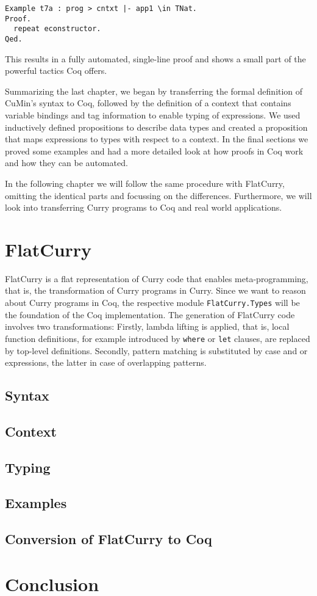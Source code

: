 \documentclass[fleqn]{scrreprt}
\newcommand{\todo}[1]{\marginpar{\textbf{TODO:} #1}}
\begin{document}
\begin{verbatim}
Example t7a : prog > cntxt |- app1 \in TNat.
Proof.
  repeat econstructor.
Qed.
\end{verbatim}
This results in a fully automated, single-line proof and shows a small part of the powerful tactics Coq offers.
\par
Summarizing the last chapter, we began by transferring the formal definition of CuMin's syntax to Coq, followed by the definition of a context that contains variable bindings and tag information to enable typing of expressions. We used inductively defined propositions to describe data types and created a proposition that maps expressions to types with respect to a context. In the final sections we proved some examples and had a more detailed look at how proofs in Coq work and how they can be automated.
\par
In the following chapter we will follow the same procedure with FlatCurry, omitting the identical parts and focussing on the differences. Furthermore, we will look into transferring Curry programs to Coq and real world applications.
\chapter{FlatCurry}
FlatCurry is a flat representation of Curry code that enables meta-programming, that is, the transformation of Curry programs in Curry.\cite{kics2manual} Since we want to reason about Curry programs in Coq, the respective module \texttt{FlatCurry.Types} will be the foundation of the Coq implementation. The generation of FlatCurry code involves two transformations: Firstly, lambda lifting is applied, that is, local function definitions, for example introduced by \texttt{where} or \texttt{let} clauses, are replaced by top-level definitions. Secondly, pattern matching is substituted by case and or expressions, the latter in case of overlapping patterns.
\par
\todo{Kapitelüberblick}
\section{Syntax}
\section{Context}
\section{Typing}
\section{Examples}
\section{Conversion of FlatCurry to Coq}
\chapter{Conclusion}

\appendix



\end{document}
